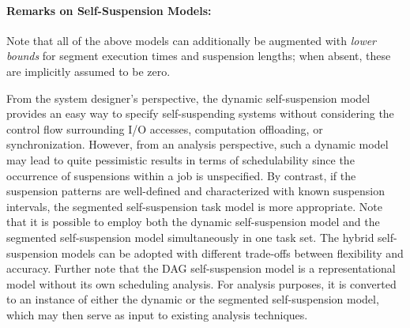 \paragraph{Remarks on Self-Suspension Models:} 

Note that all of the above models can additionally be augmented with \emph{lower bounds} for segment execution times and suspension 
lengths; when absent, these are implicitly assumed to be zero.


From the system designer's perspective, the dynamic self-suspension model provides an easy way to specify self-suspending systems 
without considering the control flow surrounding I/O accesses, computation offloading, or synchronization. However, from an analysis perspective, such a 
dynamic model may lead to quite pessimistic results in terms of schedulability since the occurrence of suspensions within a job is 
unspecified. By contrast, if the suspension patterns are well-defined and characterized with known suspension intervals, the 
segmented self-suspension task model is more appropriate.   
Note that it is possible to employ both the dynamic self-suspension model and the segmented self-suspension model simultaneously 
in one task set.
The hybrid self-suspension models can be adopted
with different
trade-offs between flexibility and accuracy.
Further note that the DAG self-suspension model is a representational model without its own scheduling analysis. For analysis purposes, it is converted to an instance of either the dynamic or the segmented self-suspension model, which may then serve as input to existing analysis techniques. 


  







